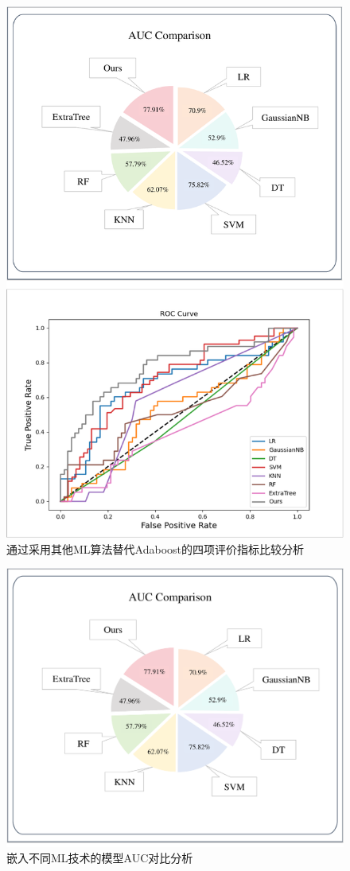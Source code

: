     \begin{figure}[h]
      \centering
      \includegraphics[width=0.7\linewidth]{figs/paper5aucroc.pdf}
      \caption{通过采用其他ML算法替代Adaboost的四项评价指标比较分析}\label{paper5aucroc}
     \end{figure}
\fi
     
    \begin{figure}[ht]
      \centering
      \includegraphics[width=0.85\linewidth]{figs/paper5aucML.pdf}
      \caption{嵌入不同ML技术的模型AUC对比分析}\label{paper5aucML}
     \end{figure}
     
